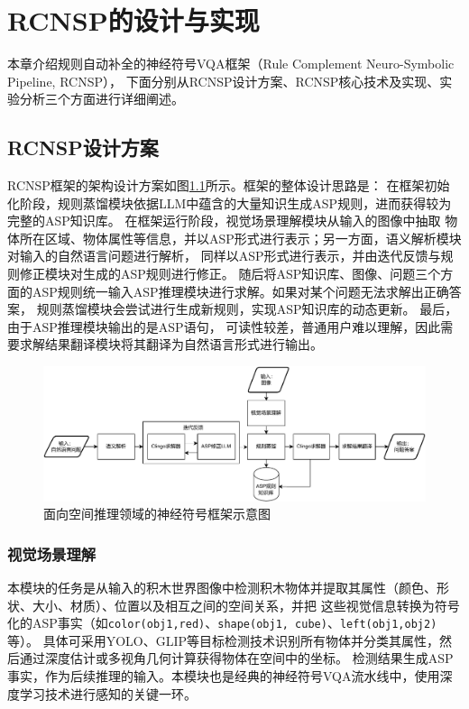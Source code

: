 \chapter{RCNSP的设计与实现}
本章介绍规则自动补全的神经符号VQA框架（Rule Complement Neuro-Symbolic Pipeline, RCNSP），
下面分别从RCNSP设计方案、RCNSP核心技术及实现、实验分析三个方面进行详细阐述。
\section{RCNSP设计方案}
RCNSP框架的架构设计方案如图\ref{fig:pipeline}所示。框架的整体设计思路是：
在框架初始化阶段，规则蒸馏模块依据LLM中蕴含的大量知识生成ASP规则，进而获得较为完整的ASP知识库。
在框架运行阶段，视觉场景理解模块从输入的图像中抽取
物体所在区域、物体属性等信息，并以ASP形式进行表示；另一方面，语义解析模块对输入的自然语言问题进行解析，
同样以ASP形式进行表示，并由迭代反馈与规则修正模块对生成的ASP规则进行修正。
随后将ASP知识库、图像、问题三个方面的ASP规则统一输入ASP推理模块进行求解。如果对某个问题无法求解出正确答案，
规则蒸馏模块会尝试进行生成新规则，实现ASP知识库的动态更新。
最后，由于ASP推理模块输出的是ASP语句，
可读性较差，普通用户难以理解，因此需要求解结果翻译模块将其翻译为自然语言形式进行输出。
\begin{figure}[h]
    \centering
    \includegraphics[width=\textwidth]{figures/pipeline-crop.pdf}
    \caption{面向空间推理领域的神经符号框架示意图}
    \label{fig:pipeline}
\end{figure}
\subsection{视觉场景理解}
本模块的任务是从输入的积木世界图像中检测积木物体并提取其属性（颜色、形状、大小、材质）、位置以及相互之间的空间关系，并把
这些视觉信息转换为符号化的ASP事实（如\texttt{color(obj1,red)}、\texttt{shape(obj1, cube)}、\texttt{left(obj1,obj2)}等）。
具体可采用YOLO、GLIP等目标检测技术识别所有物体并分类其属性，然后通过深度估计或多视角几何计算获得物体在空间中的坐标。
检测结果生成ASP事实，作为后续推理的输入。本模块也是经典的神经符号VQA流水线中，使用深度学习技术进行感知的关键一环。

